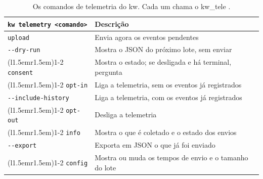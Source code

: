 \begin{table}[htbp]
  \centering
  \caption{Os comandos de telemetria do kw. Cada um chama o kw\_tele
    \citep{kwfork_telemetry}.}
  \label{tab:comandos-telemetria}
  \providecommand{\kwopcao}{}\renewcommand{\kwopcao}[1]{\hspace{1.5em}\texttt{-{}-#1}}%
  \begin{tabular}{@{}l>{\raggedright\arraybackslash\hyphenpenalty=10000}p{}@{}}
    \toprule
    \texttt{kw telemetry <comando>} & Descrição \\
    \midrule
    \texttt{upload}             & Envia agora os eventos pendentes \\
    \kwopcao{dry-run}           & Mostra o JSON do próximo lote, sem enviar \\
    \cmidrule(l{1.5em}r{1.5em}){1-2}
    \texttt{consent}            & Mostra o estado; se desligada e há terminal, pergunta \\
    \cmidrule(l{1.5em}r{1.5em}){1-2}
    \texttt{opt-in}             & Liga a telemetria, sem os eventos já registrados \\
    \kwopcao{include-history}   & Liga a telemetria, com os eventos já registrados \\
    \cmidrule(l{1.5em}r{1.5em}){1-2}
    \texttt{opt-out}            & Desliga a telemetria \\
    \cmidrule(l{1.5em}r{1.5em}){1-2}
    \texttt{info}               & Mostra o que é coletado e o estado dos envios \\
    \kwopcao{export}            & Exporta em JSON o que já foi enviado \\
    \cmidrule(l{1.5em}r{1.5em}){1-2}
    \texttt{config}             & Mostra ou muda os tempos de envio e o tamanho do lote \\
    \bottomrule
  \end{tabular}
\end{table}
